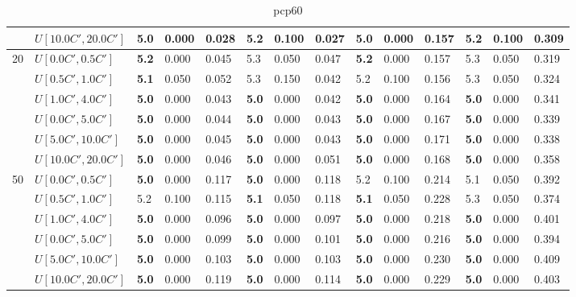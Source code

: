 \begin{table}[h]
{\begin{tabular}{|l|l||l|l|l||l|l|l||l|l|l||l|l|l|}
       & $U[10.0C',20.0C']$ & \textbf{5.0} & 0.000 & 0.028 & 5.2 & 0.100 & 0.027 & \textbf{5.0} & 0.000 & 0.157 & 5.2 & 0.100 & 0.309 \\
      \hline\hline
      \multirow{6}{*}{20} & $U[0.0C',0.5C']$ & \textbf{5.2} & 0.000 & 0.045 & 5.3 & 0.050 & 0.047 & \textbf{5.2} & 0.000 & 0.157 & 5.3 & 0.050 & 0.319 \\
       & $U[0.5C',1.0C']$ & \textbf{5.1} & 0.050 & 0.052 & 5.3 & 0.150 & 0.042 & 5.2 & 0.100 & 0.156 & 5.3 & 0.050 & 0.324 \\
       & $U[1.0C',4.0C']$ & \textbf{5.0} & 0.000 & 0.043 & \textbf{5.0} & 0.000 & 0.042 & \textbf{5.0} & 0.000 & 0.164 & \textbf{5.0} & 0.000 & 0.341 \\
       & $U[0.0C',5.0C']$ & \textbf{5.0} & 0.000 & 0.044 & \textbf{5.0} & 0.000 & 0.043 & \textbf{5.0} & 0.000 & 0.167 & \textbf{5.0} & 0.000 & 0.339 \\
       & $U[5.0C',10.0C']$ & \textbf{5.0} & 0.000 & 0.045 & \textbf{5.0} & 0.000 & 0.043 & \textbf{5.0} & 0.000 & 0.171 & \textbf{5.0} & 0.000 & 0.338 \\
       & $U[10.0C',20.0C']$ & \textbf{5.0} & 0.000 & 0.046 & \textbf{5.0} & 0.000 & 0.051 & \textbf{5.0} & 0.000 & 0.168 & \textbf{5.0} & 0.000 & 0.358 \\
      \hline\hline
      \multirow{6}{*}{50} & $U[0.0C',0.5C']$ & \textbf{5.0} & 0.000 & 0.117 & \textbf{5.0} & 0.000 & 0.118 & 5.2 & 0.100 & 0.214 & 5.1 & 0.050 & 0.392 \\
       & $U[0.5C',1.0C']$ & 5.2 & 0.100 & 0.115 & \textbf{5.1} & 0.050 & 0.118 & \textbf{5.1} & 0.050 & 0.228 & 5.3 & 0.050 & 0.374 \\
       & $U[1.0C',4.0C']$ & \textbf{5.0} & 0.000 & 0.096 & \textbf{5.0} & 0.000 & 0.097 & \textbf{5.0} & 0.000 & 0.218 & \textbf{5.0} & 0.000 & 0.401 \\
       & $U[0.0C',5.0C']$ & \textbf{5.0} & 0.000 & 0.099 & \textbf{5.0} & 0.000 & 0.101 & \textbf{5.0} & 0.000 & 0.216 & \textbf{5.0} & 0.000 & 0.394 \\
       & $U[5.0C',10.0C']$ & \textbf{5.0} & 0.000 & 0.103 & \textbf{5.0} & 0.000 & 0.103 & \textbf{5.0} & 0.000 & 0.230 & \textbf{5.0} & 0.000 & 0.409 \\
       & $U[10.0C',20.0C']$ & \textbf{5.0} & 0.000 & 0.119 & \textbf{5.0} & 0.000 & 0.114 & \textbf{5.0} & 0.000 & 0.229 & \textbf{5.0} & 0.000 & 0.403 \\
      \hline
      \end{tabular}
      }
      \caption{pcp60}
      \label{tab:pcp60}\end{table}


